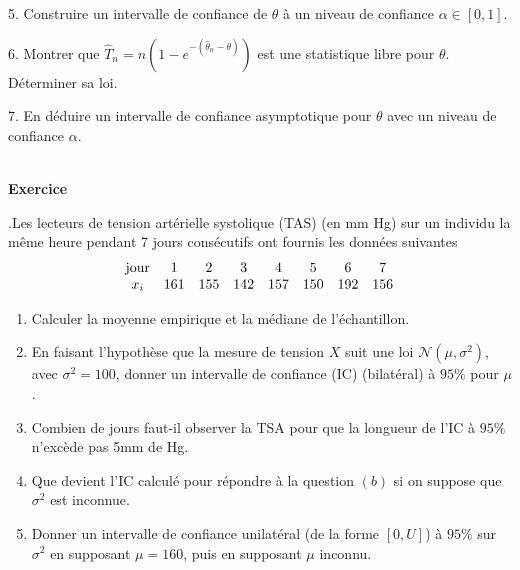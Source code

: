 \documentclass[11pt,a4paper]{article}
\newcounter{exo}
\def\exo{\mbox{}\\[0em]\hspace*{0em}\bf Exercice
\addtocounter{exo}{1}\arabic{exo}.\rm\hspace{1ex}}
\begin{document}
5. Construire un intervalle de confiance de $\theta$ à un niveau
de confiance $\alpha \in [0,1]$.

\vspace{2mm}

6. Montrer que $\hat T_n = n \left(1 - e^{-(\hat \theta_n -
\theta)} \right)$ est une statistique libre pour $\theta$.
Déterminer sa loi.

\vspace{2mm}

7. En déduire un intervalle de confiance asymptotique pour
$\theta$ avec un niveau de confiance $\alpha$.


\exo Les lecteurs de tension art\'erielle systolique (TAS) (en mm Hg) sur un individu \a la m\^eme heure pendant 7 jours cons\'ecutifs ont fournis les donn\'ees suivantes
\[
 \begin{array}{c*{8}c}
{\rm jour}  &  1   & 2  & 3   &  4    & 5  & 6  & 7  \\
 x_i &  161 & 155   & 142  &157  & 150  &  192 & 156 
 \end{array}  
\]
\begin{enumerate}
\item Calculer la moyenne empirique et la m\'ediane de l'\'echantillon.
\item En faisant l'hypoth\`ese que la mesure de tension $X$ suit une loi $\mathcal{N}(\mu,\sigma^2)$, avec $\sigma^2=100$, donner un intervalle de confiance (IC) (bilat\'eral) \`a $95 \%$ pour $\mu$.
\item Combien de jours faut-il observer la TSA pour que la longueur de l'IC \`a $95\%$ n'exc\`ede pas 5mm de Hg.
\item Que devient l'IC calcul\'e pour r\'epondre \`a  la question  $(b)$ si on suppose que $\sigma^2$ est inconnue.
\item Donner un intervalle de confiance unilat\'eral (de la forme $[0,U]$) \`a $95\%$ sur $\sigma^2$ en supposant $\mu=160$, puis en supposant $\mu$ inconnu.
\end{enumerate}
\end{document}
